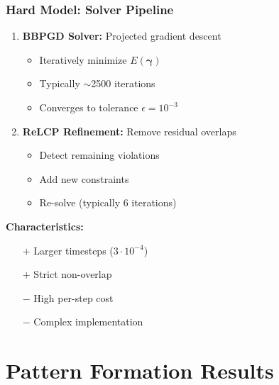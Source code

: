 \documentclass[10pt,t]{beamer}
\begin{document}
\begin{frame}
    \frametitle{Hard Model: Solver Pipeline}

    \begin{enumerate}
        \item \textbf{BBPGD Solver:} Projected gradient descent
              \begin{itemize}
                  \item Iteratively minimize $E(\boldsymbol{\gamma})$
                  \item Typically $\sim$2500 iterations
                  \item Converges to tolerance $\epsilon = 10^{-3}$
              \end{itemize}

              \vspace{0.3cm}

        \item \textbf{ReLCP Refinement:} Remove residual overlaps
              \begin{itemize}
                  \item Detect remaining violations
                  \item Add new constraints
                  \item Re-solve (typically 6 iterations)
              \end{itemize}
    \end{enumerate}

    \vspace{0.5cm}

    \textbf{Characteristics:}
    \begin{itemize}
        \item[$+$] Larger timesteps ($3 \cdot 10^{-4}$)
        \item[$+$] Strict non-overlap
        \item[$-$] High per-step cost
        \item[$-$] Complex implementation
    \end{itemize}

\end{frame}


\section{Pattern Formation Results}
\end{document}
